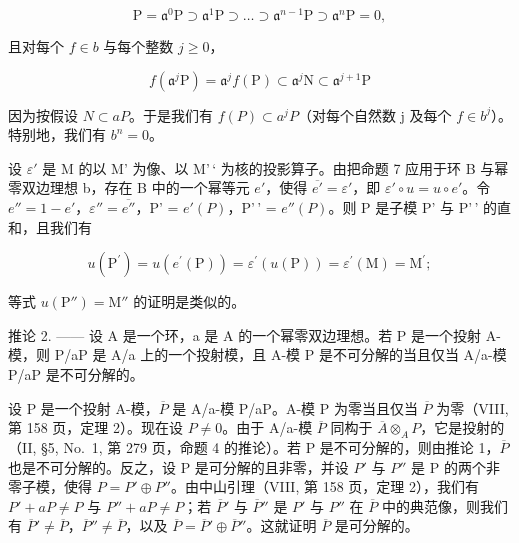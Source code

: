 \[
\mathrm{P} = \mathfrak {a} ^ {0} \mathrm{P} \supset \mathfrak {a} ^ {1} \mathrm{P} \supset \dots \supset \mathfrak {a} ^ {n - 1} \mathrm{P} \supset \mathfrak {a} ^ {n} \mathrm{P} = 0,
\]

且对每个 \(f \in b\) 与每个整数 \(j \geqslant 0\)，

\[
f (\mathfrak {a} ^ {j} \mathrm{P}) = \mathfrak {a} ^ {j} f (\mathrm{P}) \subset \mathfrak {a} ^ {j} \mathrm{N} \subset \mathfrak {a} ^ {j + 1} \mathrm{P}
\]

因为按假设 \(N \subset aP\)。于是我们有 \(f(P) \subset a^{j}P\)（对每个自然数 j 及每个 \(f \in b^{j}\)）。特别地，我们有 \(b^{n} = 0\)。

设 \(\varepsilon'\) 是 M 的以 M' 为像、以 M'\,` 为核的投影算子。由把命题 7 应用于环 B 与幂零双边理想 b，存在 B 中的一个幂等元 \(e'\)，使得 \(\overline{e'} = \varepsilon'\)，即 \(\varepsilon' \circ u = u \circ e'\)。令 \(e'' = 1 - e'\)，\(\varepsilon'' = \overline{e''}\)，P' = \(e'(P)\)，P'\,' = \(e''(P)\)。则 P 是子模 P' 与 P'\,' 的直和，且我们有

\[
u (\mathrm{P} ^ {\prime}) = u (e ^ {\prime} (\mathrm{P})) = \varepsilon^ {\prime} (u (\mathrm{P})) = \varepsilon^ {\prime} (\mathrm{M}) = \mathrm{M} ^ {\prime};
\]

等式 \(u(\mathrm{P}'') = \mathrm{M}''\) 的证明是类似的。

推论 2. —— 设 A 是一个环，a 是 A 的一个幂零双边理想。若 P 是一个投射 A-模，则 P/aP 是 A/a 上的一个投射模，且 A-模 P 是不可分解的当且仅当 A/a-模 P/aP 是不可分解的。

设 P 是一个投射 A-模，\(\overline{P}\) 是 A/a-模 P/aP。A-模 P 为零当且仅当 \(\overline{P}\) 为零（VIII, 第 158 页，定理 2）。现在设 \(P \neq 0\)。由于 A/a-模 \(\overline{P}\) 同构于 \(\overline{A} \otimes_{A} P\)，它是投射的（II, §5, No.~1, 第 279 页，命题 4 的推论）。若 P 是不可分解的，则由推论 1，\(\overline{P}\) 也是不可分解的。反之，设 P 是可分解的且非零，并设 \(P'\) 与 \(P''\) 是 P 的两个非零子模，使得 \(P = P' \oplus P''\)。由中山引理（VIII, 第 158 页，定理 2），我们有 \(P' + aP \neq P\) 与 \(P'' + aP \neq P\)；若 \(\overline{P}'\) 与 \(\overline{P}''\) 是 \(P'\) 与 \(P''\) 在 \(\overline{P}\) 中的典范像，则我们有 \(\overline{P}' \neq \overline{P}\)，\(\overline{P}'' \neq \overline{P}\)，以及 \(\overline{P} = \overline{P}' \oplus \overline{P}''\)。这就证明 \(\overline{P}\) 是可分解的。
